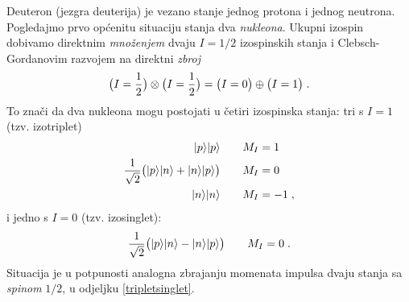 \begin{primjer}[deuteron]

Deuteron (jezgra deuterija) je vezano stanje jednog protona i jednog
neutrona. Pogledajmo prvo općenitu situaciju stanja dva
\emph{nukleona}. Ukupni izospin dobivamo direktnim \emph{množenjem}
dvaju $I=1/2$ izospinskih stanja i Clebsch-Gordanovim razvojem na
direktni \emph{zbroj}
\begin{equation}
 \big(I=\frac{1}{2}\big) \otimes  \big(I=\frac{1}{2}\big) = 
\big(I=0\big) \oplus \big(I=1\big) \;.
\end{equation}
To znači da dva nukleona mogu postojati u četiri izospinska stanja:
tri s $I=1$ (tzv. izotriplet)
\begin{align}
  | p \rangle| p \rangle \qquad & M_I = 1 \\
  \frac{1}{\sqrt{2}} \big( | p \rangle| n \rangle+| n \rangle| p \rangle\big)
  \qquad & M_I = 0 \\
  | n \rangle| n \rangle \qquad & M_I = -1 \;,
\end{align}
i jedno s $I=0$ (tzv. izosinglet):
\begin{equation}
  \frac{1}{\sqrt{2}} \big( | p \rangle| n \rangle-| n \rangle| p \rangle\big)   \qquad  M_I = 0 \;.
\label{izosinglet}
\end{equation}
Situacija je u potpunosti analogna zbrajanju momenata impulsa
dvaju stanja sa \emph{spinom} $1/2$, u odjeljku \ref{tripletsinglet}.


\end{primjer}
